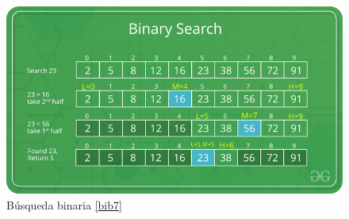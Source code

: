\begin{figure}[!htbp]
    \centering
    \includegraphics[width=.6\textwidth,height=.4\textwidth]{figures/binary_search.png}
    \caption{Búsqueda binaria \ref{bib7}}
    \label{fig:my_label}
\end{figure}